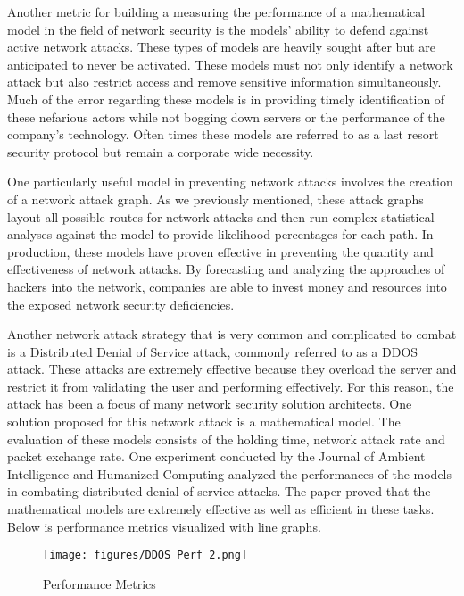 \documentclass{article}
\begin{document}
Another metric for building a measuring the performance of a mathematical model in the field of network security is the models’ ability to defend against active network attacks. These types of models are heavily sought after but are anticipated to never be activated. These models must not only identify a network attack but also restrict access and remove sensitive information simultaneously.  Much of the error regarding these models is in providing timely identification of these nefarious actors while not bogging down servers or the performance of the company’s technology. Often times these models are referred to as a last resort security protocol but remain a corporate wide necessity. 

One particularly useful model in preventing network attacks involves the creation of a network attack graph. As we previously mentioned, these attack graphs layout all possible routes for network attacks and then run complex statistical analyses against the model to provide likelihood percentages for each path. In production, these models have proven effective in preventing the quantity and effectiveness of network attacks. By forecasting and analyzing the approaches of hackers into the network, companies are able to invest money and resources into the exposed network security deficiencies. 

Another network attack strategy that is very common and complicated to combat is a Distributed Denial of Service attack, commonly referred to as a DDOS attack. These attacks are extremely effective because they overload the server and restrict it from validating the user and performing effectively. For this reason, the attack has been a focus of many network security solution architects. One solution proposed for this network attack is a mathematical model. The evaluation of these models consists of the holding time, network attack rate and packet exchange rate. One experiment conducted by the Journal of Ambient Intelligence and Humanized Computing analyzed the performances of the models in combating distributed denial of service attacks. The paper proved that the mathematical models are extremely effective as well as efficient in these tasks. Below is performance metrics visualized with line graphs\cite{bhushan2019distributed}.


\begin{figure}
    \centering
    \texttt{[image: figures/DDOS Perf 2.png]}
    \caption{Performance Metrics}
\end{figure}
\end{document}

